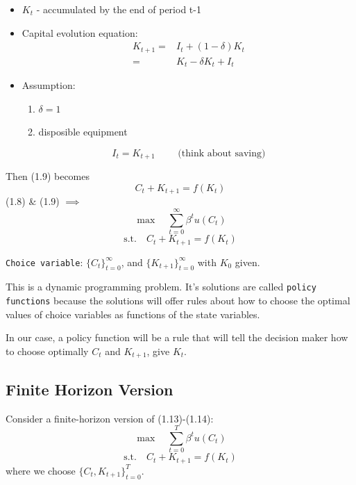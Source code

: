 \documentclass[twoside]{article}
\begin{document}
\begin{itemize}
  \item $K_t$ - accumulated by the end of period t-1
  \item Capital evolution equation:
        \begin{equation}
          \begin{aligned}
          K_{t+1} =& I_t + (1- \delta) K_t\\
          =& K_t - \delta K_t + I_t
        \end{aligned}
        \end{equation}
  \item Assumption:
        \begin{enumerate}
          \item $\delta = 1$
          \item disposible equipment
        \end{enumerate}
        \begin{equation}
          I_t = K_{t+1} \qquad\text{ (think about saving)} 
        \end{equation}
\end{itemize}
Then (1.9) becomes
\begin{equation}
  C_t + K_{t+1} = f(K_t)
\end{equation}
(1.8) \& (1.9) $\implies$
\begin{equation}
  \max \quad \sum_{t=0}^\infty \beta^t u(C_t)
\end{equation}
\begin{equation}
  \text{s.t.} \quad C_t + K_{t+1} = f(K_t) 
\end{equation}

\texttt{Choice variable}: $\{C_t\}_{t=0}^{\infty}$, and $\{K_{t+1}\}_{t=0}^{\infty}$ with $K_0$ given.

This is a dynamic programming problem. It's solutions are called \texttt{policy functions} because the solutions will offer rules about how to choose the optimal values of choice variables as functions of the state variables.

In our case, a policy function will be a rule that will tell the decision maker how to choose optimally $C_t$ and $K_{t+1}$, give $K_t$.

\subsection{Finite Horizon Version}
Consider a finite-horizon version of (1.13)-(1.14):
\begin{equation}
  \max \quad \sum_{t=0}^T \beta^t u(C_t)
\end{equation}
\begin{equation}
  \text{s.t.} \quad C_t + K_{t+1} = f(K_t) 
\end{equation}
where we choose $\{C_t, K_{t+1}\}_{t=0}^{T}$.
\end{document}
